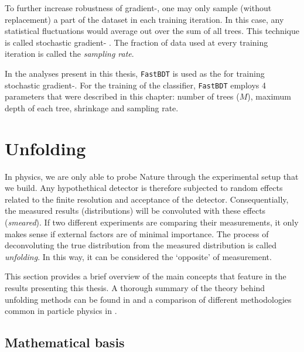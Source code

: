 To further increase robustness of gradient-, one may only sample (without replacement) a part of the dataset in each training iteration.
In this case, any statistical fluctuations would average out over the sum of all trees. 
This technique is called stochastic gradient- \cite{FRIEDMAN2002367}.
The fraction of data used at every training iteration is called the \textit{sampling rate}.

In the analyses present in this thesis, \texttt{FastBDT} \cite{Keck:2017gsv} is used as the \MVA for training stochastic gradient-.
For the training of the classifier, \texttt{FastBDT} employs 4 parameters that were described in this chapter: number of trees ($M$), maximum depth of each tree, shrinkage and sampling rate. 

\section{Unfolding}\label{sec:unfolding}

In physics, we are only able to probe Nature through the experimental setup that we build.
Any hypothethical detector is therefore subjected to random effects related to the finite resolution and acceptance of the detector.
Consequentially, the measured results (distributions) will be convoluted with these effects (\textit{smeared}).
If two different experiments are comparing their measurements, it only makes sense if external factors are of minimal importance.
The process of deconvoluting the true distribution from the measured distribution is called \textit{unfolding}.
In this way, it can be considered the `opposite' of measurement.

This section provides a brief overview of the main concepts that feature in the results presenting this thesis.
A thorough summary of the theory behind unfolding methods can be found in \cite{Behnke:2013pga,Blobel_Lohrmann_1998} and a comparison of different methodologies common in particle physics in \cite{Schmitt:2016orm,Cowan:2002in,Brenner:2019lmf}.

\subsection{Mathematical basis}

